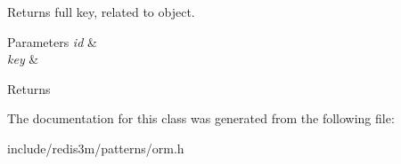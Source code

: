 Returns full key, related to object. 


\begin{DoxyParams}{Parameters}
{\em id} & \\
\hline
{\em key} & \\
\hline
\end{DoxyParams}
\begin{DoxyReturn}{Returns}

\end{DoxyReturn}


The documentation for this class was generated from the following file\-:\begin{DoxyCompactItemize}
\item 
include/redis3m/patterns/orm.\-h\end{DoxyCompactItemize}
